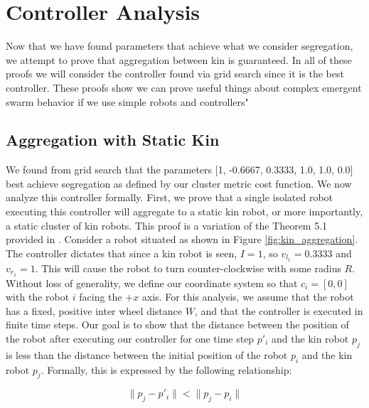 \documentclass[conference]{IEEEtran}
\begin{document}
\section{Controller Analysis}

  Now that we have found parameters that achieve what we consider segregation, we attempt to prove that aggregation between kin is guaranteed. In all of these proofs we will consider the controller found via grid search since it is the best controller. These proofs show we can prove useful things about complex emergent swarm behavior if we use simple robots and controllers"

  \subsection{Aggregation with Static Kin}

    We found from grid search that the parameters [1, -0.6667, 0.3333, 1.0, 1.0, 0.0] best achieve segregation as defined by our cluster metric cost function. We now analyze this controller formally. First, we prove that a single isolated robot executing this controller will aggregate to a static kin robot, or more importantly, a static cluster of kin robots. This proof is a variation of the Theorem 5.1 provided in \cite{gauci_self-organized_2014}. Consider a robot situated as shown in Figure \ref{fig:kin_aggregation}. The controller dictates that since a kin robot is seen, $I=1$, so $v_{l_1} = 0.3333$ and $v_{r_1} = 1$. This will cause the robot to turn counter-clockwise with some radius $R$. Without loss of generality, we define our coordinate system so that $c_i=[0,0]$ with the robot $i$ facing the $+x$ axis. For this analysis, we assume that the robot has a fixed, positive inter wheel distance $W$, and that the controller is executed in finite time steps. Our goal is to show that the distance between the position of the robot after executing our controller for one time step $p'_i$ and the kin robot $p_j$ is less than the distance between the initial position of the robot $p_i$ and the kin robot $p_j$. Formally, this is expressed by the following relationship:

    \begin{equation} \label{eq:agg}
      \lVert p_j - p'_i \rVert < \lVert p_j - p_i \rVert
    \end{equation}
\end{document}
